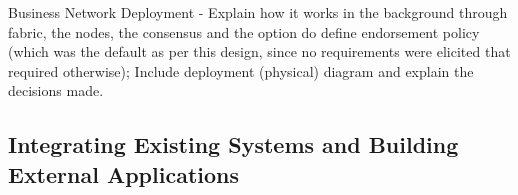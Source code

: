 
Business Network Deployment - Explain how it works in the background through fabric, the nodes, the consensus and the option do define endorsement policy (which was the default as per this design, since no requirements were elicited that required otherwise); Include deployment (physical) diagram and explain the decisions made.

\subsection{Integrating Existing Systems and Building External Applications}


